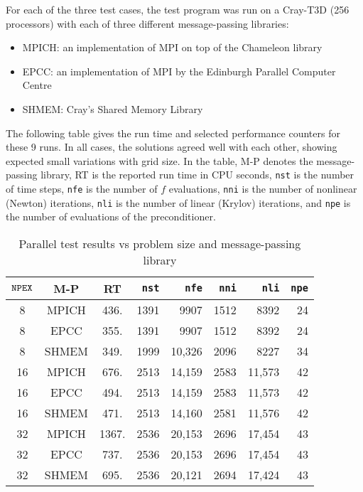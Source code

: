 For each of the three test cases, the test program was run on a Cray-T3D
(256 processors) with each of three different message-passing libraries:

\begin{itemize}
\item  MPICH: an implementation of MPI on top of the Chameleon library

\item  EPCC: an implementation of MPI by the Edinburgh Parallel Computer
Centre

\item  SHMEM: Cray's Shared Memory Library
\end{itemize}

The following table gives the run time and selected performance counters for
these 9 runs. In all cases, the solutions agreed well with each other,
showing expected small variations with grid size. In the table, M-P denotes
the message-passing library, RT is the reported run time in CPU seconds, 
{\tt nst} is the number of time steps, {\tt nfe} is the number of $f$
evaluations, {\tt nni} is the number of nonlinear (Newton) iterations,
{\tt nli} is the number of linear (Krylov) iterations, and {\tt npe} is the
number of evaluations of the preconditioner.

\begin{table}[htb]
\begin{center}
\begin{tabular}{|c|c|c|r|r|r|r|r|}
\hline
${\tt NPEX}$ & M-P & RT & {\tt nst} & {\tt nfe} & {\tt nni} & {\tt nli} & 
{\tt npe} \\ \hline\hline
8 & MPICH & 436. & 1391 & 9907 & 1512 & 8392 & 24 \\ \hline
8 & EPCC & 355. & 1391 & 9907 & 1512 & 8392 & 24 \\ \hline
8 & SHMEM & 349. & 1999 & 10,326 & 2096 & 8227 & 34 \\ \hline\hline
16 & MPICH & 676. & 2513 & 14,159 & 2583 & 11,573 & 42 \\ \hline
16 & EPCC & 494. & 2513 & 14,159 & 2583 & 11,573 & 42 \\ \hline
16 & SHMEM & 471. & 2513 & 14,160 & 2581 & 11,576 & 42 \\ \hline\hline
32 & MPICH & 1367. & 2536 & 20,153 & 2696 & 17,454 & 43 \\ \hline
32 & EPCC & 737. & 2536 & 20,153 & 2696 & 17,454 & 43 \\ \hline
32 & SHMEM & 695. & 2536 & 20,121 & 2694 & 17,424 & 43 \\ \hline
\end{tabular}
\label{testtable}
\end{center}
\caption{Parallel {\cvode} test results vs problem size and message-passing library}
\end{table}

